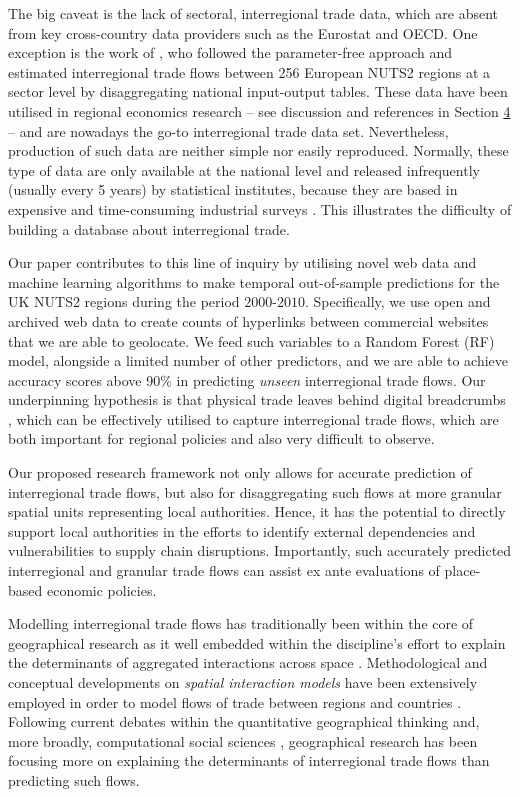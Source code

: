 \documentclass[]{interact}
\theoremstyle{plain}%
\theoremstyle{definition}
\theoremstyle{remark}
\begin{document}
The big caveat is the lack of sectoral, interregional trade data, which
are absent from key cross-country data providers such as the Eurostat
and OECD. One exception is the work of \citet{thissen2013integrated},
who followed the parameter-free \citet{simini2012universal} approach and
estimated interregional trade flows between 256 European NUTS2 regions
at a sector level by disaggregating national input-output tables. These
data have been utilised in regional economics research -- see discussion
and references in Section \protect\hyperlink{sec:4}{4} -- and are
nowadays the go-to interregional trade data set. Nevertheless,
production of such data are neither simple nor easily reproduced.
Normally, these type of data are only available at the national level
and released infrequently (usually every 5 years) by statistical
institutes, because they are based in expensive and time-consuming
industrial surveys \citep{boero2018regional}. This illustrates the
difficulty of building a database about interregional trade.

Our paper contributes to this line of inquiry by utilising novel web
data and machine learning algorithms to make temporal out-of-sample
predictions for the UK NUTS2 regions during the period
\(2000\)-\(2010\). Specifically, we use open and archived web data to
create counts of hyperlinks between commercial websites that we are able
to geolocate. We feed such variables to a Random Forest (RF) model,
alongside a limited number of other predictors, and we are able to
achieve accuracy scores above 90\% in predicting \emph{unseen}
interregional trade flows. Our underpinning hypothesis is that physical
trade leaves behind digital breadcrumbs \citep{rabari_storper2014},
which can be effectively utilised to capture interregional trade flows,
which are both important for regional policies and also very difficult
to observe.

Our proposed research framework not only allows for accurate prediction
of interregional trade flows, but also for disaggregating such flows at
more granular spatial units representing local authorities. Hence, it
has the potential to directly support local authorities in the efforts
to identify external dependencies and vulnerabilities to supply chain
disruptions. Importantly, such accurately predicted interregional and
granular trade flows can assist ex ante evaluations of place-based
economic policies.

Modelling interregional trade flows has traditionally been within the
core of geographical research as it well embedded within the
discipline's effort to explain the determinants of aggregated
interactions across space \citep[for a recent review
see][]{oshan2020spatial}. Methodological and conceptual developments on
\emph{spatial interaction models} have been extensively employed in
order to model flows of trade between regions
\citep{chun2012modeling, paul2008incorporating} and countries
\citep{de2017testing, de2017competing}. Following current debates within
the quantitative geographical thinking \citep{singleton2021geographic}
and, more broadly, computational social sciences
\citep{lazer2009social}, geographical research has been focusing more on
explaining the determinants of interregional trade flows than predicting
such flows.
\end{document}
